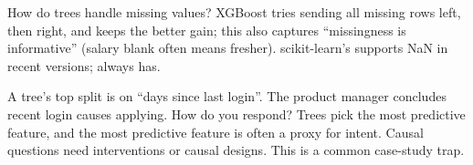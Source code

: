 \begin{qa}{How do trees handle missing values?}
\why XGBoost tries sending all missing rows left, then right, and keeps the better gain; this also captures ``missingness is
informative'' (salary blank often means fresher). scikit-learn's  supports NaN in recent versions;
 always has.
\end{qa}

\begin{qa}{\deep A tree's top split is on ``days since last login''. The product manager concludes recent login causes applying.
How do you respond?}
\why Trees pick the most predictive feature, and the most predictive feature is often a proxy for intent. Causal questions need
interventions or causal designs. This is a common case-study trap.
\end{qa}
